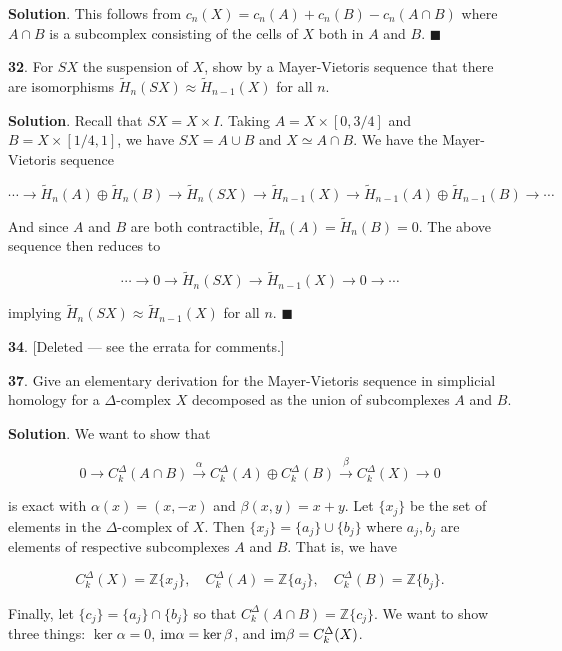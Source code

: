 \documentclass{article}
\newcommand{\Z}{\mathbb{Z}}
\newcommand{\im}{\textnormal{im}}
\begin{document}
\textbf{Solution}. This follows from $c_{n}(X) = c_{n}(A) + c_{n}(B) - c_{n}(A\cap B)$ where $A\cap B$ is a subcomplex consisting of the cells of $X$ both in $A$ and $B$. $\blacksquare$
\bigskip
\bigskip

\textbf{32}. For $SX$ the suspension of $X$, show by a Mayer-Vietoris sequence that there are isomorphisms $\tilde{H}_{n}(SX)\approx \tilde{H}_{n-1}(X)$ for all $n$.
\medskip

\textbf{Solution}. Recall that $SX = X\times I$. Taking $A = X\times [0, 3/4]$ and $B = X\times [1/4, 1]$, we have $SX = A\cup B$ and $X\simeq A\cap B$. We have the Mayer-Vietoris sequence

$$\cdots \to \tilde{H}_{n}(A)\oplus \tilde{H}_{n}(B)\to \tilde{H}_{n}(SX)\to \tilde{H}_{n-1}(X)\to \tilde{H}_{n-1}(A)\oplus \tilde{H}_{n-1}(B)\to \cdots$$

And since $A$ and $B$ are both contractible, $\tilde{H}_{n}(A) = \tilde{H}_{n}(B) = 0$. The above sequence then reduces to

$$\cdots \to 0\to \tilde{H}_{n}(SX)\to \tilde{H}_{n-1}(X)\to 0\to \cdots$$

implying $\tilde{H}_{n}(SX)\approx \tilde{H}_{n-1}(X)$ for all $n$. $\blacksquare$
\bigskip
\bigskip

\textbf{34}. [Deleted — see the errata for comments.]
\bigskip
\bigskip

\textbf{37}. Give an elementary derivation for the Mayer-Vietoris sequence in simplicial homology for a $\Delta$-complex $X$ decomposed as the union of subcomplexes $A$ and $B$.
\medskip

\textbf{Solution}. We want to show that

$$0\to C_{k}^{\Delta}(A\cap B)\xrightarrow{\alpha} C_{k}^{\Delta}(A)\oplus C_{k}^{\Delta}(B)\xrightarrow{\beta} C_{k}^{\Delta}(X)\to 0$$

is exact with $\alpha(x) = (x, -x)$ and $\beta(x, y) = x + y$. Let $\{x_{j}\}$ be the set of elements in the $\Delta$-complex of $X$. Then $\{x_{j}\} = \{a_{j}\}\cup \{b_{j}\}$
where $a_{j}, b_{j}$ are elements of respective subcomplexes $A$ and $B$. That is, we have

$$C_{k}^{\Delta}(X) = \Z \{x_{j}\},\quad C_{k}^{\Delta}(A) = \Z \{a_{j}\},\quad C_{k}^{\Delta}(B) = \Z \{b_{j}\}.$$

Finally, let $\{c_{j}\} = \{a_{j}\}\cap \{b_{j}\}$ so that $C_{k}^{\Delta}(A\cap B) = \Z \{c_{j}\}$. We want to show three things: $\ker \alpha = 0$, $\im \alpha = \ker \beta$, and $\im \beta = C_{k}^{\Delta}(X)$.
\medskip
\end{document}
